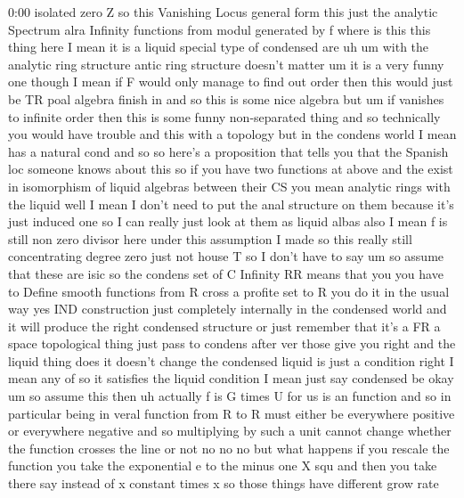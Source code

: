\begin{unfinished}{0:00}
isolated
zero
Z  so  this  Vanishing  Locus  general  form
this  just  the  analytic
Spectrum  alra  Infinity  functions  from
modul  generated  by  f
where  is
this  this  thing
here  I
mean  it  is  a
liquid  special  type  of  condensed
are
uh  um  with  the  analytic  ring
structure  antic  ring  structure  doesn't
matter  um
it  is  a  very  funny  one  though  I  mean  if
F  would  only  manage  to  find  out  order
then  this  would  just  be  TR  poal
algebra  finish
in  and  so  this  is  some  nice  algebra  but
um  if  vanishes  to  infinite
order  then  this  is  some  funny
non-separated
thing  and  so  technically  you  would  have
trouble  and  this  with  a  topology  but  in
the  condens  world  I  mean  has  a  natural
cond  and
so
so  here's  a  proposition  that  tells  you
that  the  Spanish  loc  someone  knows  about
this  so  if  you  have  two  functions  at
above  and  the  exist  in
isomorphism  of  liquid
algebras  between  their
CS
you  mean  analytic  rings  with  the
liquid  well  I  mean  I  don't  need  to  put
the  anal  structure  on  them  because  it's
just  induced  one  so  I  can  really  just
look  at  them  as  liquid  albas  also  I  mean
f  is  still  non  zero  divisor  here  under
this  assumption  I  made  so  this  really
still  concentrating  degree  zero  just  not
house  T  so  I  don't  have  to
say
um  so  assume  that  these  are
isic
so  the  condens  set  of  C  Infinity  RR
means  that  you  you  have  to  Define  smooth
functions  from  R  cross  a  profite  set  to
R  you  do  it  in  the  usual  way  yes
IND  construction  just  completely
internally  in  the  condensed  world  and  it
will  produce  the  right  condensed
structure  or  just  remember  that  it's  a
FR  a  space  topological  thing  just  pass
to  condens  after  ver  those  give  you
right  and  the  liquid  thing  does  it
doesn't  change  the
condensed  liquid  is  just  a  condition
right  I  mean  any
of  so  it  satisfies  the  liquid  condition
I
mean  just  say
condensed
be
okay
um  so  assume
this  then  uh  actually  f  is  G  times  U  for
us  is  an
function  and  so  in  particular  being  in
veral  function  from  R  to  R  must  either
be  everywhere  positive  or  everywhere
negative  and  so  multiplying  by  such  a
unit  cannot  change  whether  the  function
crosses  the  line  or
not
no  no  no  but  what  happens  if  you  rescale
the  function  you  take  the  exponential  e
to  the  minus  one  X  squ  and  then  you  take
there  say  instead  of  x  constant  times  x
so  those  things  have  different  grow  rate

\end{unfinished}
